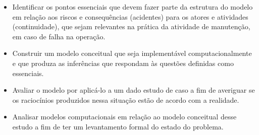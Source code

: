 \begin{itemize}
    \item Identificar os pontos essenciais que devem fazer parte da estrutura do modelo em relação aos riscos e consequências (acidentes) para os atores e atividades (continuidade), que sejam relevantes na prática da atividade de manutenção, em caso de falha na operação. 
    \item Construir um modelo conceitual que seja implementável computacionalmente e que produza as inferências que respondam às questões definidas como essenciais.
    \item Avaliar o modelo por aplicá-lo a um dado estudo de caso a fim de averiguar se os raciocínios produzidos nessa situação estão de acordo com a realidade.  
    \item Analisar modelos computacionais em relação ao modelo conceitual desse estudo a fim de ter um levantamento formal do estado do problema.
\end{itemize}